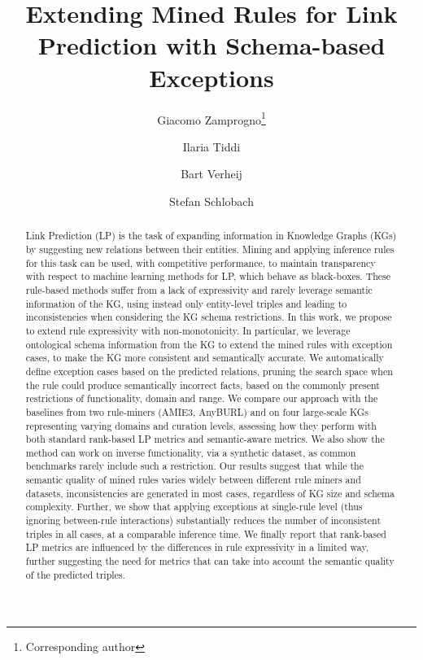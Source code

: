 \documentclass[a4paper,UKenglish,cleveref, autoref, thm-restate]{tgdk-v2021}
\title{Extending Mined Rules for Link Prediction with Schema-based Exceptions}
\author{Giacomo {Zamprogno}\footnote{Corresponding author}}{Vrije Universiteit Amsterdam, The Netherlands}{g.zamprogno@vu.nl}{https://orcid.org/0009-0009-6474-1987}{This  work  is  supported  by  the  Hybrid  Intelligence  programme (https: //www.hybrid-intelligence-centre.nl/), funded  by  a  10-year  Zwaartekracht  grant  from  the  Dutch Ministry of Education, Culture and Science (NWO).}%
\author{Ilaria Tiddi}{Vrije Universiteit Amsterdam, The Netherlands}{i.tiddi@vu.nl}{https://orcid.org/0000-0001-7116-9338}{}
\author{Bart Verheij}{University of Groningen, The Netherlands}{Bart.Verheij@rug.nl}{https://orcid.org/0000-0001-8927-8751}{}
\author{Stefan Schlobach}{Vrije Universiteit Amsterdam, The Netherlands}{k.s.schlobach@vu.nl}{https://orcid.org/0000-0002-3282-1597}{}
\begin{document}
\maketitle

\begin{abstract}
Link Prediction (LP) is the task of expanding information in Knowledge Graphs (KGs) by suggesting new relations between their entities. Mining and applying inference rules for this task can be used, with competitive performance, to maintain transparency with respect to machine learning methods for LP, which behave as black-boxes. These rule-based methods suffer from a lack of expressivity and  rarely leverage semantic information of the KG, using instead only entity-level triples and leading to inconsistencies when considering the KG schema restrictions.
In this work, we propose to extend rule expressivity with non-monotonicity. In particular, we leverage ontological schema information from the KG to extend the mined rules with exception cases, to make the KG more consistent and semantically accurate. We automatically define exception cases based on the predicted relations, pruning the search space  when the rule could produce semantically incorrect facts, based on the commonly present restrictions of functionality, domain and range. 
We compare our approach with the baselines from two rule-miners (AMIE3, AnyBURL) and on four large-scale KGs representing varying domains and curation levels, assessing how they perform with both standard rank-based LP metrics and semantic-aware metrics. We also show the method can work on inverse functionality, via a synthetic dataset, as common benchmarks rarely include such a restriction.  
Our results suggest that while the semantic quality of mined rules varies widely between different rule miners and datasets, inconsistencies are generated in most cases, regardless of KG size and schema complexity. Further, we show that applying exceptions at single-rule level (thus ignoring between-rule interactions) substantially reduces the number of inconsistent triples in all cases, at a comparable inference time. We finally report that rank-based LP metrics are influenced by the differences in rule expressivity in a limited way, further suggesting the need for  metrics that can take into account the semantic quality of the predicted triples.
\end{abstract}
\end{document}
